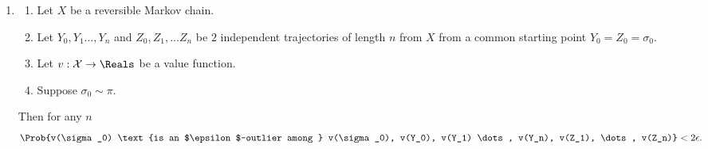 \documentclass[12pt]{article}
\begin{document}
\begin{enumerate}
\item
  \begin{theorem}
    \label{thm:parallelsignificance:twoepstest}
    \begin{enumerate}
        \item
            Let \( X \) be a reversible Markov chain.
        \item
            Let \( Y_0, Y_1 \dots, Y_n \) and \( Z_0, Z_1, \dots Z_n \)
            be \( 2 \) independent trajectories of length \( n \) from \(
            X \) from a common starting point \( Y_0 = Z_0 = \sigma_0 \).
        \item
            Let \( v :  \mathcal{X} \to \Reals \) be a value function.
        \item
            Suppose \( \sigma_0 \sim \pi \).
    \end{enumerate}
    Then for any \( n \)
    \[
        \Prob{v(\sigma_0) \text{is an $\epsilon$-outlier among } v(\sigma_0),
        v(Y_0), v(Y_1) \dots, v(Y_n), v(Z_1), \dots, v(Z_n)} < 2
        \epsilon.
      \]
      

\end{theorem}
\end{enumerate}
\end{document}
